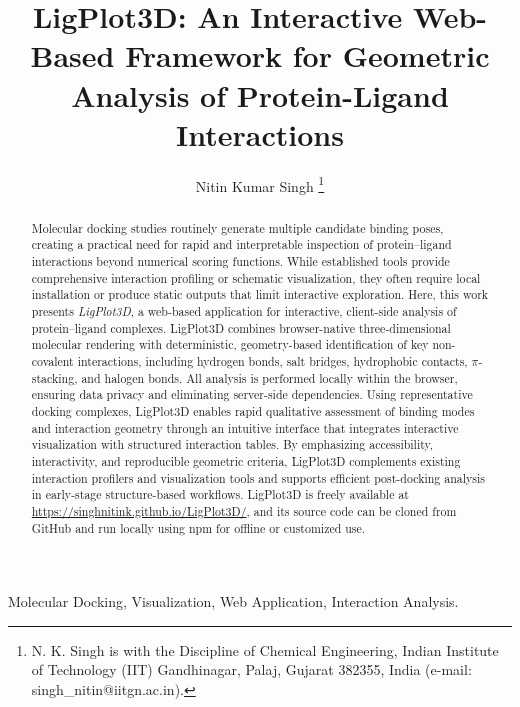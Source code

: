 \documentclass[lettersize,journal]{IEEEtran}
\begin{document}
\title{LigPlot3D: An Interactive Web-Based Framework for Geometric Analysis of Protein-Ligand Interactions}

\author{Nitin Kumar Singh
\thanks{N. K. Singh is with the Discipline of Chemical Engineering, Indian Institute of Technology (IIT) Gandhinagar, Palaj, Gujarat 382355, India (e-mail: singh_nitin@iitgn.ac.in).}}


\maketitle

\begin{abstract}
Molecular docking studies routinely generate multiple candidate binding poses, creating a practical need for rapid and interpretable inspection of protein--ligand interactions beyond numerical scoring functions. While established tools provide comprehensive interaction profiling or schematic visualization, they often require local installation or produce static outputs that limit interactive exploration. Here, this work presents \textit{LigPlot3D}, a web-based application for interactive, client-side analysis of protein--ligand complexes. LigPlot3D combines browser-native three-dimensional molecular rendering with deterministic, geometry-based identification of key non-covalent interactions, including hydrogen bonds, salt bridges, hydrophobic contacts, $\pi$-stacking, and halogen bonds. All analysis is performed locally within the browser, ensuring data privacy and eliminating server-side dependencies. Using representative docking complexes, LigPlot3D enables rapid qualitative assessment of binding modes and interaction geometry through an intuitive interface that integrates interactive visualization with structured interaction tables. By emphasizing accessibility, interactivity, and reproducible geometric criteria, LigPlot3D complements existing interaction profilers and visualization tools and supports efficient post-docking analysis in early-stage structure-based workflows. LigPlot3D is freely available at \url{https://singhnitink.github.io/LigPlot3D/}, and its source code can be cloned from GitHub and run locally using npm for offline or customized use.
\end{abstract}

\begin{IEEEkeywords}
Molecular Docking, Visualization, Web Application, Interaction Analysis.
\end{IEEEkeywords}
\end{document}
